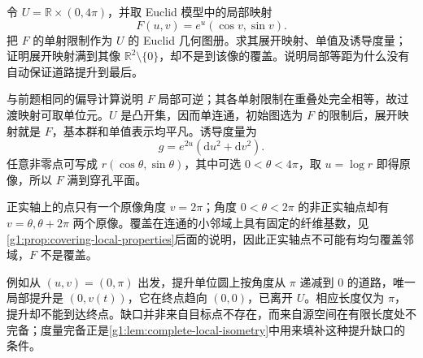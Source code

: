 \begin{exercise}
	\label{g1:ex:surjective-development-not-covering}
	令 \(U=\mathbb R\times(0,4\pi)\)，并取 Euclid 模型中的局部映射
	\[
		F(u,v)=e^u(\cos v,\sin v).
	\]
	把 \(F\) 的单射限制作为 \(U\) 的 Euclid 几何图册。求其展开映射、单值及诱导度量；证明展开映射满到其像 \(\mathbb R^2\setminus\{0\}\)，却不是到该像的覆盖。说明局部等距为什么没有自动保证道路提升到最后。
\end{exercise}
\begin{solution}
	与前题相同的偏导计算说明 \(F\) 局部可逆；其各单射限制在重叠处完全相等，故过渡映射可取单位元。\(U\) 是凸开集，因而单连通，初始图选为 \(F\) 的限制后，展开映射就是 \(F\)，基本群和单值表示均平凡。诱导度量为
	\[
		g=e^{2u}(\mathrm{d}u^2+\mathrm{d}v^2).
	\]
	任意非零点可写成 \(r(\cos\theta,\sin\theta)\)，其中可选 \(0<\theta<4\pi\)，取 \(u=\log r\) 即得原像，所以 \(F\) 满到穿孔平面。

	正实轴上的点只有一个原像角度 \(v=2\pi\)；角度 \(0<\theta<2\pi\) 的非正实轴点却有 \(v=\theta,\theta+2\pi\) 两个原像。覆盖在连通的小邻域上具有固定的纤维基数，见\cref{g1:prop:covering-local-properties}后面的说明，因此正实轴点不可能有均匀覆盖邻域，\(F\) 不是覆盖。

	例如从 \((u,v)=(0,\pi)\) 出发，提升单位圆上按角度从 \(\pi\) 递减到 \(0\) 的道路，唯一局部提升是 \((0,v(t))\)，它在终点趋向 \((0,0)\)，已离开 \(U\)。相应长度仅为 \(\pi\)，提升却不能到达终点。缺口并非来自目标点不存在，而来自源空间在有限长度处不完备；度量完备正是\cref{g1:lem:complete-local-isometry}中用来填补这种提升缺口的条件。
\end{solution}
